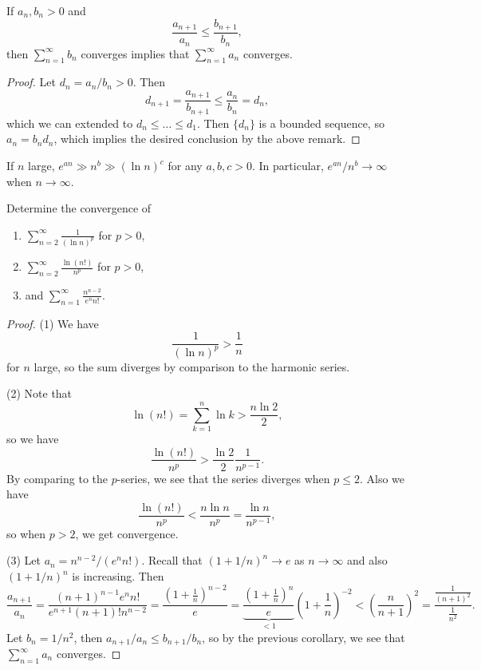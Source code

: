 \begin{corollary}
  If $a_n, b_n > 0$ and
  \[
    \frac{a_{n + 1}}{a_n} \le \frac{b_{n + 1}}{b_n},
  \]
  then $\sum_{n = 1}^\infty b_n$ converges implies
  that $\sum_{n = 1}^\infty a_n$ converges.
\end{corollary}

\begin{proof}
  Let $d_n = a_n / b_n > 0$. Then
  \[
    d_{n + 1} = \frac{a_{n + 1}}{b_{n + 1}} \le \frac{a_n}{b_n} = d_n,
  \]
  which we can extended to $d_n \le \dots \le d_1$.
  Then $\{d_n\}$ is a bounded sequence, so
  $a_n = b_n d_n$, which implies the desired conclusion
  by the above remark.
\end{proof}

\begin{remark}
  If $n$ large, $e^{a n} \gg n^b \gg (\ln n)^c$
  for any $a, b, c > 0$. In particular,
  $e^{an} / n^b \to \infty$ when $n \to \infty$.
\end{remark}

\begin{example}
  Determine the convergence of
  \begin{enumerate}
    \item $\displaystyle \sum_{n = 2}^\infty \frac{1}{(\ln n)^p}$
      for $p > 0$,
    \item $\displaystyle \sum_{n = 2}^\infty \frac{\ln(n!)}{n^p}$ for $p > 0$,
    \item and $\displaystyle \sum_{n = 1}^\infty \frac{n^{n - 2}}{e^n n!}$.
  \end{enumerate}
\end{example}

\begin{proof}
  (1) We have
  \[
    \frac{1}{(\ln n)^p} > \frac{1}{n}
  \]
  for $n$ large, so the sum diverges by comparison to
  the harmonic series.

  (2) Note that
  \[
    \ln(n!) = \sum_{k = 1}^n \ln k > \frac{n \ln 2}{2},
  \]
  so we have
  \[
    \frac{\ln(n!)}{n^p} > \frac{\ln 2}{2} \frac{1}{n^{p - 1}}.
  \]
  By comparing to the $p$-series, we see that the
  series diverges when $p \le 2$. Also we have
  \[
    \frac{\ln(n!)}{n^p} < \frac{n \ln n}{n^p}
    = \frac{\ln n}{n^{p - 1}},
  \]
  so when $p > 2$, we get convergence.

  (3) Let $a_n = n^{n - 2} / (e^n n!)$. Recall that
  $(1 + 1 / n)^n \to e$ as $n \to \infty$ and also
  $(1 + 1 / n)^n$ is increasing. Then
  \[
    \frac{a_{n + 1}}{a_n}
    = \frac{(n + 1)^{n - 1} e^n n!}{e^{n + 1}(n + 1)! n^{n - 2}}
    = \frac{\left(1 + \frac{1}{n}\right)^{n - 2}}{e}
    = \underbrace{\frac{\left(1 + \frac{1}{n}\right)^n}{e}}_{< 1} \left(1 + \frac{1}{n}\right)^{-2}
    < \left(\frac{n}{n + 1}\right)^2 = \frac{\frac{1}{(n + 1)^2}}{\frac{1}{n^2}}.
  \]
  Let $b_n = 1 / n^2$, then $a_{n + 1} / a_n \le b_{n + 1} / b_n$,
  so by the previous corollary, we
  see that $\sum_{n = 1}^\infty a_n$ converges.
\end{proof}

